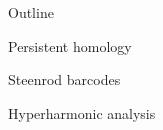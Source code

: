 
{


	\begin{frame}
		\titlepage
	\end{frame}
}

\begin{frame}{Outline}
	\medskip

	\Large{
		\qquad{} Persistent homology\medskip

		\qquad{} Steenrod barcodes\medskip

		\qquad{} Hyperharmonic analysis
	}
\end{frame}